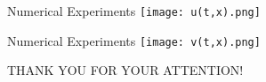 \documentclass{beamer}
\begin{document}
\begin{frame}{Numerical Experiments}
	\texttt{[image: u(t,x).png]}
	
\end{frame}
\begin{frame}{Numerical Experiments}
	\texttt{[image: v(t,x).png]}
\end{frame}






\begin{frame}

THANK YOU FOR YOUR ATTENTION!
\end{frame}
\end{document}
